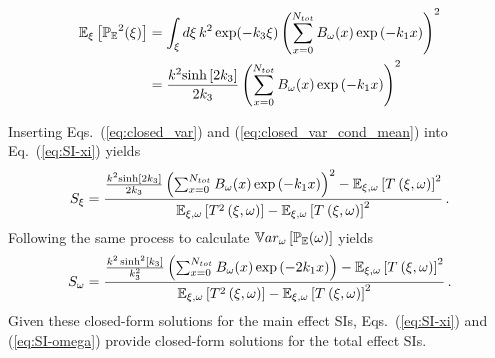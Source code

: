 \begin{align}\label{eq:EExi_of_EEomega_sq}
\begin{split}
    \EExi{\PE^2(\xi)} &= \int_{\xi} d\xi \, k^2 \exp(-k_3 \xi) \left( \sum_{x=0}^{\Nt} \Bom \e{-k_1 x} \right)^2 \\
    &= \frac{k^2 \sinhh{2 k_3}}{2 k_3} \left( \sum_{x=0}^{\Nt} \Bom \e{-k_1 x} \right)^2
\end{split}
\end{align}

Inserting Eqs.~(\ref{eq:closed_var}) and (\ref{eq:closed_var_cond_mean}) into Eq.~(\ref{eq:SI-xi}) yields
\begin{equation}
    S_{\xi} = \frac{\frac{k^2 \sinhh{2 k_3}}{2 k_3} \left( \sum_{x=0}^{\Nt} \Bom \e{-k_1 x} \right)^2 - \EExo{\T}^2}{\EExo{\T[2]} - \EExo{\T}^2} \,.
\end{equation}
Following the same process to calculate $\Vom{\PE(\omega)}$ yields 
\begin{equation}
    S_{\omega} = \frac{\frac{k^2 \sinh^2 \left[k_3\right]}{k_3^2 } \left( \sum_{x=0}^{\Nt} \Bom \e{-2 k_1 x} \right)  - \EExo{\T}^2}{\EExo{\T[2]} - \EExo{\T}^2} \,.
\end{equation}
Given these closed-form solutions for the main effect SIs, Eqs.~(\ref{eq:SI-xi}) and (\ref{eq:SI-omega}) provide closed-form solutions for the total effect SIs.

